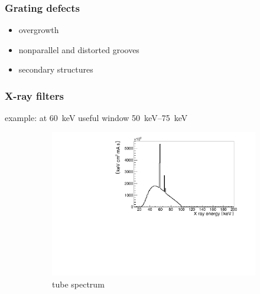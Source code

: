 \documentclass[first,firstsupp]{ETHclass}
\begin{document}
    \begin{frame}
        \frametitle{Grating defects}
        \begin{itemize}
            \item overgrowth
            \item nonparallel and distorted grooves
            \item secondary structures
        \end{itemize}
    \end{frame}

    \begin{frame}
        \frametitle{X-ray filters}
        example: at \SI{60}{\kilo\electronvolt} useful window
        \SIrange{50}{75}{\kilo\electronvolt}
        \begin{figure}[h]
            \centering
            \begin{subfigure}
                [h]{.49\textwidth}
                \centering
                \includegraphics[width=\textwidth]{unfiltered_spectrum} 
                \caption*{tube spectrum}
            \end{subfigure}
            \begin{subfigure}
                [h]{.49\textwidth}
                \centering

\end{subfigure}
\end{figure}
\end{frame}
\end{document}

